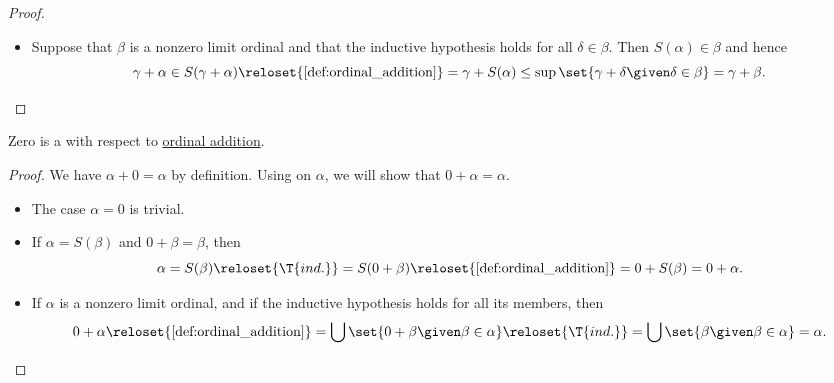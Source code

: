 \begin{proof}
\begin{itemize}
\begin{itemize}
      \item If \( \alpha = \delta \) then
      \begin{equation*}
        \gamma + \alpha
        \in
        S(\gamma + \alpha)
        \reloset {\ref{def:ordinal_addition}} =
        \gamma + S(\alpha)
        =
        \gamma + \beta.
      \end{equation*}
    \end{itemize}

    \item Suppose that \( \beta \) is a nonzero limit ordinal and that the inductive hypothesis holds for all \( \delta \in \beta \). Then \( S(\alpha) \in \beta \) and hence
    \begin{equation*}
      \gamma + \alpha
      \in
      S(\gamma + \alpha)
      \reloset {\ref{def:ordinal_addition}} =
      \gamma + S(\alpha)
      \leq
      \sup\set{ \gamma + \delta \given \delta \in \beta }
      =
      \gamma + \beta.
    \end{equation*}
  \end{itemize}
\end{proof}

\begin{lemma}\label{thm:ordinal_addition_neutral}
  Zero is a  with respect to \hyperref[def:ordinal_addition]{ordinal addition}.
\end{lemma}
\begin{proof}
  We have \( \alpha + 0 = \alpha \) by definition. Using  on \( \alpha \), we will show that \( 0 + \alpha = \alpha \).
  \begin{itemize}
    \item The case \( \alpha = 0 \) is trivial.
    \item If \( \alpha = S(\beta) \) and \( 0 + \beta = \beta \), then
    \begin{equation*}
      \alpha
      =
      S(\beta)
      \reloset {\T{ind.}} =
      S(0 + \beta)
      \reloset {\ref{def:ordinal_addition}} =
      0 + S(\beta)
      =
      0 + \alpha.
    \end{equation*}

    \item If \( \alpha \) is a nonzero limit ordinal, and if the inductive hypothesis holds for all its members, then
    \begin{equation*}
      0 + \alpha
      \reloset {\ref{def:ordinal_addition}} =
      \bigcup\set{ 0 + \beta \given \beta \in \alpha }
      \reloset {\T{ind.}} =
      \bigcup\set{ \beta \given \beta \in \alpha }
      =
      \alpha.
    \end{equation*}
  \end{itemize}
\end{proof}

